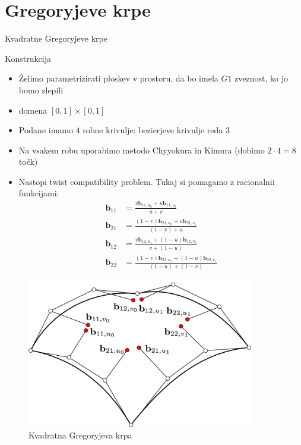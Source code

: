 \documentclass[a4paper,8pt]{beamer}
\newcommand{\tbf}{\textbf}
\begin{document}
\section{Gregoryjeve krpe}
\begin{frame}{Kvadratne Gregoryjeve krpe}


Konstrukcija
\begin{itemize}
	\item Želimo parametrizirati ploskev v prostoru, da bo imela $G1$ zveznost, ko jo bomo zlepili
	\item domena $[0,1] \times [0,1]$
	\item Podane imamo $4$ robne krivulje: bezierjeve krivulje reda $3$
	\item Na vsakem robu uporabimo metodo Chyyokura in Kimura (dobimo $2 \cdot 4 = 8$ točk)
	\item Nastopi twist compatibility problem. Tukaj si pomagamo z racionalnii funkcijami:
		\begin{align*}
		\textbf{b}_{11} &=  \frac{v \textbf{b}_{11,u_0}+u\tbf{b}_{11,v_0}}{u +v} \\
		\tbf{b}_{21} &= \frac{(1-v) \tbf{b}_{21,u_0}+u\tbf{b}_{21,v_1}}{(1-v)+u} \\
		\tbf{b}_{12} &= \frac{v \tbf{b}_{12,u_1}+(1-u)\tbf{b}_{12,v_0}}{v+(1-u)} \\
		\tbf{b}_{22} &= \frac{(1-v) \tbf{b}_{22,u_1}+(1-u)\tbf{b}_{22,v_1}}{(1-u)+(1-v)} 
		\end{align*}
\end{itemize}
	
\end{frame}
\begin{frame}
	\begin{figure}[h]
		\centering
		\includegraphics[width=10cm]{gregory_krpe_kvadratna.jpg}
		\caption{Kvadratna Gregoryjeva krpa}
	\end{figure}
\end{frame}
\end{document}
